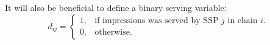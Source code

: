 \documentclass{article}
\begin{document}
\begin{large}
It will also be beneficial to define a binary serving variable: 
\begin{equation*}
 d_{ij} =\begin{cases}
    1, & \text{if impressions was served by SSP $j$ in chain $i$}.\\
    0, & \text{otherwise}.
  \end{cases}
\end{equation*}

\iffalse
\subsection{Problem formulation}
The problem formulation is similar to the single-tag problem.

\begin{equation}
\begin{aligned}
&\text{Maximize} &\sum_{i}{I_i r_i(x_i)} \equiv H(I_i,x_i)\\
&s.t. \\ 
&\forall i: I_i \geq 0 , x_i > 0\\
&\sum_{i}{I_i}=1\\
&\sum_{i}{I_i fill_i(x_i)} \geq f_1,\\ 
&\frac{\sum{I_i r_i(x_i)}}{\sum{I_i fill_i(x_i)}} \geq e_1\\
\end{aligned} 
\end{equation}
\fi
\end{large}
\end{document}
